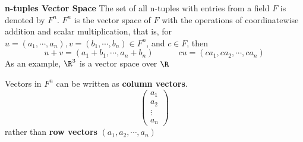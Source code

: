 \documentclass[11pt]{article}
\begin{document}
\begin{defn*}
    \textbf{n-tuples Vector Space} The set of all n-tuples with entries from a field $F$ is denoted by $F^n$. $F^n$ is the vector space of $F$ with the operations of coordinatewise addition and scalar multiplication, that is, for $u = (a_1, \cdots, a_n), v=(b_1,\cdots, b_n)\in F^n$, and $c\in F$, then 
    \[
        u+v = (a_1 + b_1, \cdots, a_n+b_n) 
        \quad \quad \quad 
        cu = (ca_1, ca_2, \cdots, ca_n)
    \]
    As an example, $\R^3$ is a vector space over $\R$
    \item Vectors in $F^n$ can be written as \textbf{column vectors}. 
    \[
        \begin{pmatrix}
            a_1 \\ a_2 \\ \vdots \\ a_n
        \end{pmatrix}    
    \]
    rather than \textbf{row vectors} $(a_1, a_2, \cdots, a_n)$
\end{defn*}
\end{document}

